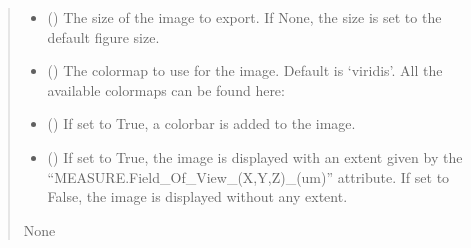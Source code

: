 \documentclass[letterpaper,10pt,english]{sphinxmanual}
\begin{document}
\begin{fulllineitems}
\begin{fulllineitems}
\begin{quote}
\begin{description}
\begin{itemize}
\item {} 
\sphinxAtStartPar
{} (\sphinxstyleliteralemphasis{\sphinxupquote{, }}) \textendash{} The size of the image to export. If None, the size is set to the default figure size.

\item {} 
\sphinxAtStartPar
{} (\sphinxstyleliteralemphasis{\sphinxupquote{, }}) \textendash{} The colormap to use for the image. Default is ‘viridis’. All the available colormaps can be found here: 

\item {} 
\sphinxAtStartPar
{} (\sphinxstyleliteralemphasis{\sphinxupquote{, }}) \textendash{} If set to True, a colorbar is added to the image.

\item {} 
\sphinxAtStartPar
{} (\sphinxstyleliteralemphasis{\sphinxupquote{, }}) \textendash{} If set to True, the image is displayed with an extent given by the “MEASURE.Field\_Of\_View\_(X,Y,Z)\_(um)” attribute. If set to False, the image is displayed without any extent.

\end{itemize}

\sphinxAtStartPar
None

\end{description}\end{quote}

\end{fulllineitems}



\end{fulllineitems}
\end{document}
